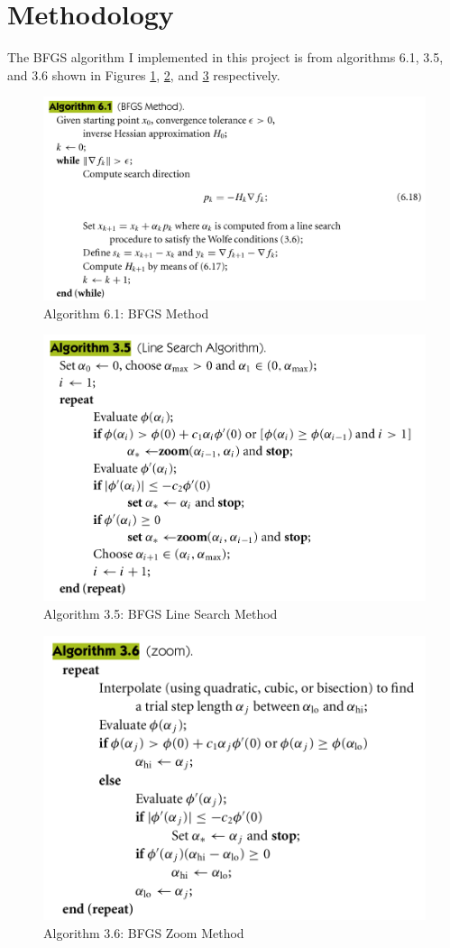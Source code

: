 \documentclass[11pt]{article}%
\begin{document}
\section {Methodology}
\label{sec:method}

The BFGS algorithm I implemented in this project is from algorithms 6.1, 3.5, and 3.6 \cite{textbook} shown in Figures \ref{fig:bfgsmethod}, \ref{fig:bfgsline}, and \ref{fig:bfgszoom} respectively.
\begin{figure}[!ht]
    \centering
   \includegraphics[width=0.75\linewidth]{al61.png}
    \caption{Algorithm 6.1: BFGS Method }
   \label{fig:bfgsmethod}
\end{figure}
\begin{figure}[!ht]
    \centering
   \includegraphics[width=0.75\linewidth]{al35.png}
    \caption{Algorithm 3.5: BFGS Line Search Method }
   \label{fig:bfgsline}
\end{figure}
\begin{figure}[!ht]
    \centering
   \includegraphics[width=0.75\linewidth]{al36.png}
    \caption{Algorithm 3.6: BFGS Zoom Method }
   \label{fig:bfgszoom}
\end{figure}
\end{document}
